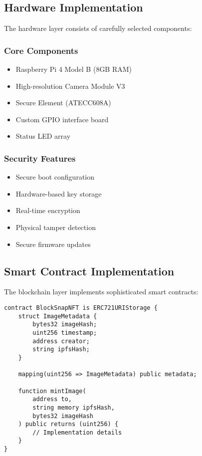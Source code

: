 \documentclass[conference]{IEEEtran}
\begin{document}
\subsection{Hardware Implementation}
The hardware layer consists of carefully selected components:

\subsubsection{Core Components}
\begin{itemize}
    \item Raspberry Pi 4 Model B (8GB RAM)
    \item High-resolution Camera Module V3
    \item Secure Element (ATECC608A)
    \item Custom GPIO interface board
    \item Status LED array
\end{itemize}

\subsubsection{Security Features}
\begin{itemize}
    \item Secure boot configuration
    \item Hardware-based key storage
    \item Real-time encryption
    \item Physical tamper detection
    \item Secure firmware updates
\end{itemize}

\subsection{Smart Contract Implementation}
The blockchain layer implements sophisticated smart contracts:

\begin{lstlisting}[language=Solidity, caption=Core NFT Contract]
contract BlockSnapNFT is ERC721URIStorage {
    struct ImageMetadata {
        bytes32 imageHash;
        uint256 timestamp;
        address creator;
        string ipfsHash;
    }
    
    mapping(uint256 => ImageMetadata) public metadata;
    
    function mintImage(
        address to,
        string memory ipfsHash,
        bytes32 imageHash
    ) public returns (uint256) {
        // Implementation details
    }
}
\end{lstlisting}
\end{document}
